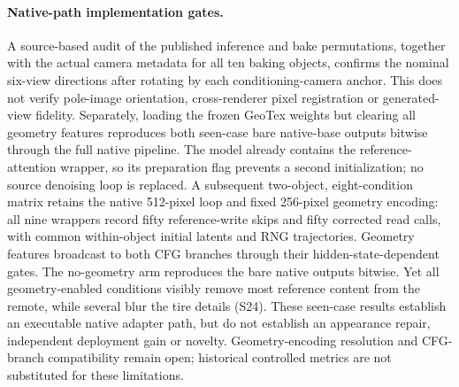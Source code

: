 \documentclass[times,twocolumn,final]{elsarticle}
\begin{document}
\paragraph{Native-path implementation gates.}
A source-based audit of the published inference and bake permutations, together with the actual camera metadata for all ten baking objects, confirms the nominal six-view directions after rotating by each conditioning-camera anchor. This does not verify pole-image orientation, cross-renderer pixel registration or generated-view fidelity. Separately, loading the frozen GeoTex weights but clearing all geometry features reproduces both seen-case bare native-base outputs bitwise through the full native pipeline. The model already contains the reference-attention wrapper, so its preparation flag prevents a second initialization; no source denoising loop is replaced. A subsequent two-object, eight-condition matrix retains the native 512-pixel loop and fixed 256-pixel geometry encoding: all nine wrappers record fifty reference-write skips and fifty corrected read calls, with common within-object initial latents and RNG trajectories. Geometry features broadcast to both CFG branches through their hidden-state-dependent gates. The no-geometry arm reproduces the bare native outputs bitwise. Yet all geometry-enabled conditions visibly remove most reference content from the remote, while several blur the tire details (S24). These seen-case results establish an executable native adapter path, but do not establish an appearance repair, independent deployment gain or novelty. Geometry-encoding resolution and CFG-branch compatibility remain open; historical controlled metrics are not substituted for these limitations.
\end{document}
